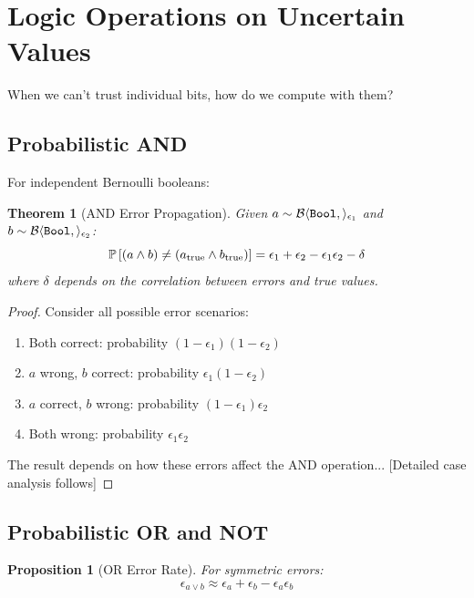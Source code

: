 \documentclass[11pt,twoside,openright]{book}
\theoremstyle{definition}
\theoremstyle{plain}
\newtheorem{theorem}[definition]{Theorem}
\newtheorem{proposition}[definition]{Proposition}
\theoremstyle{remark}
\begin{document}
\section{Logic Operations on Uncertain Values}

When we can't trust individual bits, how do we compute with them?

\subsection{Probabilistic AND}

For independent Bernoulli booleans:

\begin{theorem}[AND Error Propagation]
Given $a \sim \mathcal{B}\langle \mathtt{Bool},  \rangle_{\epsilon_1}$ and $b \sim \mathcal{B}\langle \mathtt{Bool},  \rangle_{\epsilon_2}$:
\begin{equation}
\mathbb{P}\left[(a \wedge b) \neq (a_{\text{true}} \wedge b_{\text{true}})\right] = \epsilon_1 + \epsilon_2 - \epsilon_1\epsilon_2 - \delta
\end{equation}
where $\delta$ depends on the correlation between errors and true values.
\end{theorem}

\begin{proof}
Consider all possible error scenarios:
\begin{enumerate}
    \item Both correct: probability $(1-\epsilon_1)(1-\epsilon_2)$
    \item $a$ wrong, $b$ correct: probability $\epsilon_1(1-\epsilon_2)$
    \item $a$ correct, $b$ wrong: probability $(1-\epsilon_1)\epsilon_2$
    \item Both wrong: probability $\epsilon_1\epsilon_2$
\end{enumerate}
The result depends on how these errors affect the AND operation...
[Detailed case analysis follows]
\end{proof}

\subsection{Probabilistic OR and NOT}

\begin{proposition}[OR Error Rate]
For symmetric errors:
\begin{equation}
\epsilon_{a \vee b} \approx \epsilon_a + \epsilon_b - \epsilon_a\epsilon_b
\end{equation}
\end{proposition}
\end{document}
